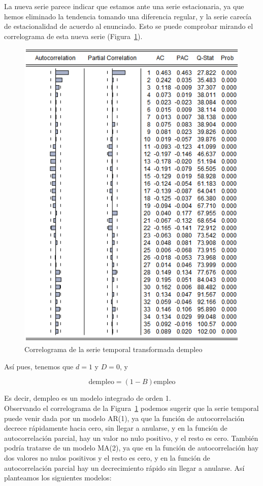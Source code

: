 \documentclass[12pt,a4paper,twoside,openright,titlepage,final]{article}
\begin{document}
La nueva serie parece indicar que estamos ante una serie estacionaria, ya que hemos eliminado la tendencia tomando una diferencia regular, y la serie carecía de estacionalidad de acuerdo al enunciado. Esto se puede comprobar mirando el correlograma de esta nueva serie (Figura~\ref{fig:correlograma-empleo-diferenciada}).\\ 

\begin{figure}[tbph!]
	\centering
	\includegraphics[width=0.7\linewidth]{imagenes/empleo/correlograma-empleo-diferenciada.png}
	\caption{Correlograma de la serie temporal transformada dempleo}
	\label{fig:correlograma-empleo-diferenciada}
\end{figure}

Así pues, tenemos que $d=1$ y $D=0$, y

\[ \text{dempleo} = (1-B) \text{empleo}\]

Es decir, dempleo es un modelo integrado de orden 1.\\

Observando el correlograma de la Figura~\ref{fig:correlograma-empleo-diferenciada} podemos sugerir que la serie temporal puede venir dada por un modelo AR(1), ya que la función de autocorrelación decrece rápidamente hacia cero, sin llegar a anularse, y en la función de autocorrelación parcial, hay un valor no nulo positivo, y el resto es cero. También podría tratarse de un modelo MA(2), ya que en la función de autocorrelación hay dos valores no nulos positivos y el resto es cero, y en la función de autocorrelación parcial hay un decrecimiento rápido sin llegar a anularse. Así planteamos los siguientes modelos:
\end{document}
